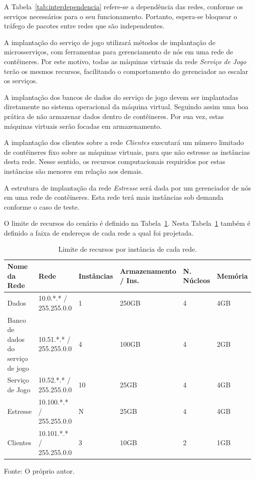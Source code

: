 A Tabela~\ref{tab:interdependencia} refere-se a dependência das redes, conforme os serviços necessários para o seu funcionamento.
%
Portanto, espera-se bloquear o tráfego de pacotes entre redes que são independentes.

A implantação do serviço de jogo utilizará métodos de implantação de microsserviços, com ferramentas para gerenciamento de nós em uma rede de contêineres.
%
Por este motivo, todas as máquinas virtuais da rede \textit{Serviço de Jogo} terão os mesmos recursos, facilitando o comportamento do gerenciador ao escalar os serviços.

A implantação dos bancos de dados do serviço de jogo devem ser implantadas diretamente no sistema operacional da máquina virtual.
%
Seguindo assim uma boa prática de não armazenar dados dentro de contêineres.
%
Por sua vez, estas máquinas virtuais serão focadas em armazenamento.

A implantação dos clientes sobre a rede \textit{Clientes} executará um número limitado de contêineres fixo sobre as máquinas virtuais, para que não estresse as instâncias desta rede.
%
Nesse sentido, os recursos computacionais requiridos por estas instâncias são menores em relação aos demais.

A estrutura de implantação da rede \textit{Estresse} será dada por um gerenciador de nós em uma rede de contêineres.
%
Esta rede terá mais instâncias sob demanda conforme o caso de teste.

O limite de recursos do cenário é definido na Tabela~\ref{tab:limite_recursos}.
%
Nesta Tabela~\ref{tab:limite_recursos} também é definido a faixa de endereços de cada rede a qual foi projetada.

\begin{table}[htb!]
\centering
\begin{adjustbox}{max width=\textwidth}
\caption{Limite de recursos por instância de cada rede.}
\label{tab:limite_recursos}
\begin{tabular}{|l|l|l|l|l|l|}
\hline
Nome da Rede                      & Rede                     & Instâncias & Armazenamento / Ins. & N. Núcleos & Memória \\ \hline
Dados                             & 10.0.*.* / 255.255.0.0   & 1          & 250GB                & 4          & 4GB     \\ \hline
Banco de dados do serviço de jogo & 10.51.*.* / 255.255.0.0  & 4          & 100GB                & 4          & 2GB     \\ \hline
Serviço de Jogo                   & 10.52.*.* / 255.255.0.0  & 10         & 25GB                 & 4          & 4GB     \\ \hline
Estresse                          & 10.100.*.* / 255.255.0.0 & N          & 25GB                 & 4          & 4GB     \\ \hline
Clientes                          & 10.101.*.* / 255.255.0.0 & 3          & 10GB                 & 2          & 1GB     \\ \hline
\end{tabular}
\end{adjustbox}

Fonte: O próprio autor.
\end{table}

